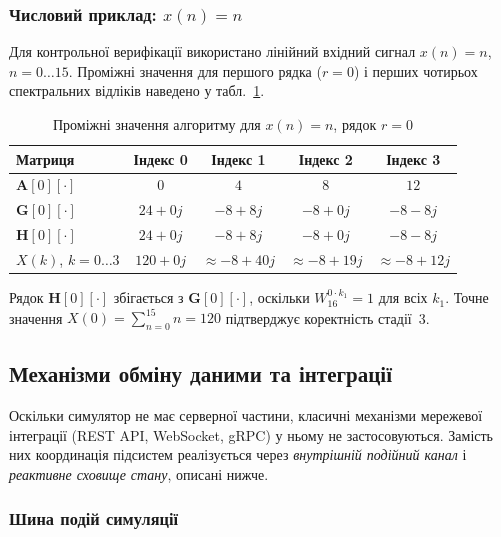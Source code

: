\subsubsection*{Числовий приклад: $x(n) = n$}

Для контрольної верифікації використано лінійний вхідний сигнал
$x(n) = n$, $n = 0 \ldots 15$. Проміжні значення для першого рядка
($r = 0$) і перших чотирьох спектральних відліків наведено у
табл.~\ref{tab:numerical}.

\begin{table}[H]
  \caption{Проміжні значення алгоритму для $x(n) = n$, рядок $r = 0$}
  \label{tab:numerical}
  \centering
  \small
  \begin{tabular}{lcccc}
    \toprule
    Матриця & Індекс 0 & Індекс 1 & Індекс 2 & Індекс 3 \\
    \midrule
    $\mathbf{A}[0][\cdot]$   & $0$       & $4$              & $8$         & $12$ \\
    $\mathbf{G}[0][\cdot]$   & $24{+}0j$ & $-8{+}8j$        & $-8{+}0j$   & $-8{-}8j$ \\
    $\mathbf{H}[0][\cdot]$   & $24{+}0j$ & $-8{+}8j$        & $-8{+}0j$   & $-8{-}8j$ \\
    $X(k)$, $k{=}0{\ldots}3$ & $120{+}0j$ & ${\approx}-8{+}40j$ & ${\approx}-8{+}19j$ & ${\approx}-8{+}12j$ \\
    \bottomrule
  \end{tabular}
\end{table}

Рядок $\mathbf{H}[0][\cdot]$ збігається з $\mathbf{G}[0][\cdot]$,
оскільки $W_{16}^{0 \cdot k_1} = 1$ для всіх $k_1$. Точне значення
$X(0) = \sum_{n=0}^{15} n = 120$ підтверджує коректність стадії~3.


\subsection{Механізми обміну даними та інтеграції}

Оскільки симулятор не має серверної частини, класичні механізми
мережевої інтеграції (REST API, WebSocket, gRPC) у ньому не
застосовуються. Замість них координація підсистем реалізується
через \emph{внутрішній подійний канал} і \emph{реактивне сховище
стану}, описані нижче.

\subsubsection*{Шина подій симуляції}

